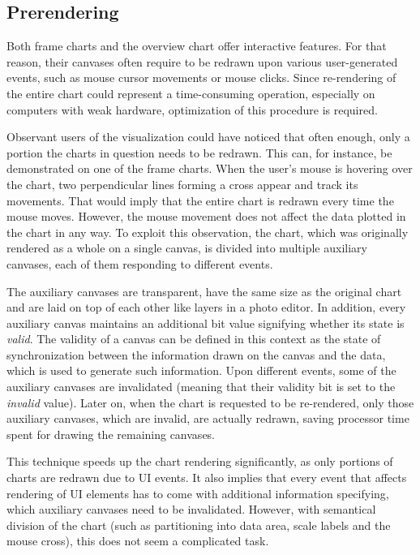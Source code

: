 \subsection{Prerendering}
Both frame charts and the overview chart offer interactive features. For that reason, their canvases often require to be redrawn upon various user-generated events, such as mouse cursor movements or mouse clicks. Since re-rendering of the entire chart could represent a time-consuming operation, especially on computers with weak hardware, optimization of this procedure is required.

Observant users of the visualization could have noticed that often enough, only a portion the charts in question needs to be redrawn. This can, for instance, be demonstrated on one of the frame charts. When the user's mouse is hovering over the chart, two perpendicular lines forming a cross  appear and track its movements. That would imply that the entire chart is redrawn every time the mouse moves. However, the mouse movement does not affect the data plotted in the chart in any way. To exploit this observation, the chart, which was originally rendered as a whole on a single canvas, is divided into multiple auxiliary canvases, each of them responding to different events.

The auxiliary canvases are transparent, have the same size as the original chart and are laid on top of each other like layers in a photo editor. In addition, every auxiliary canvas maintains an additional bit value signifying whether its state is \textit{valid}. The validity of a canvas can be defined in this context as the state of synchronization between the information drawn on the canvas and the data, which is used to generate such information. Upon different events, some of the auxiliary canvases are invalidated (meaning that their validity bit is set to the \textit{invalid} value). Later on, when the chart is requested to be re-rendered, only those auxiliary canvases, which are invalid, are actually redrawn, saving processor time spent for drawing the remaining canvases.

This technique speeds up the chart rendering significantly, as only portions of charts are redrawn due to UI events. It also implies that every event that affects rendering of UI elements has to come with additional information specifying, which auxiliary canvases need to be invalidated. However, with semantical division of the chart (such as partitioning into data area, scale labels and the mouse cross), this does not seem a complicated task.

